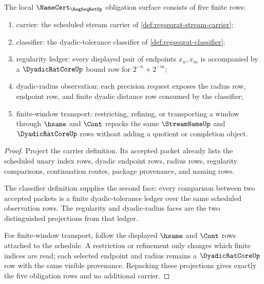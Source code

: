 \begin{theorem}
\label{thm:regseqrat-regularity-obligation-surface}
The local $\NameCert_{\RegSeqRatUp}$ obligation surface consists of five finite rows:
\begin{enumerate}
\item carrier: the scheduled stream carrier of \autoref{def:regseqrat-stream-carrier};
\item classifier: the dyadic-tolerance classifier of \autoref{def:regseqrat-classifier};
\item regularity ledger: every displayed pair of endpoints $x_n,x_m$ is accompanied by a $\DyadicRatCoreUp$ bound row for $2^{-n}+2^{-m}$;
\item dyadic-radius observation: each precision request exposes the radius row, endpoint row, and finite dyadic distance row consumed by the classifier;
\item finite-window transport: restricting, refining, or transporting a window through $\hsame$ and $\Cont$ repacks the same $\StreamNameUp$ and $\DyadicRatCoreUp$ rows without adding a quotient or completion object.
\end{enumerate}
\end{theorem}
\begin{proof}
Project the carrier definition. Its accepted packet already lists the scheduled unary index rows, dyadic endpoint rows, radius rows, regularity comparisons, continuation routes, package provenance, and naming rows.

The classifier definition supplies the second face: every comparison between two accepted packets is a finite dyadic-tolerance ledger over the same scheduled observation rows. The regularity and dyadic-radius faces are the two distinguished projections from that ledger.

For finite-window transport, follow the displayed $\hsame$ and $\Cont$ rows attached to the schedule. A restriction or refinement only changes which finite indices are read; each selected endpoint and radius remains a $\DyadicRatCoreUp$ row with the same visible provenance. Repacking these projections gives exactly the five obligation rows and no additional carrier.
\end{proof}

